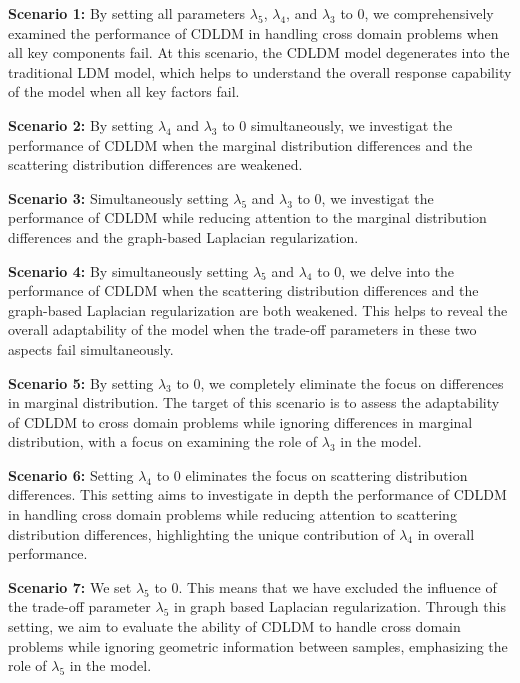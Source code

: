 \documentclass[a4paper]{cas-sc}
\begin{document}
\textbf{Scenario 1:} By setting all parameters $\lambda_5$, $\lambda_4$, and $\lambda_3$ to 0, we comprehensively examined the performance of CDLDM in handling cross domain problems when all key components fail. At this scenario, the CDLDM model degenerates into the traditional LDM model, which helps to understand the overall response capability of the model when all key factors fail.

\textbf{Scenario 2:} By setting $\lambda_4$ and $\lambda_3$ to 0 simultaneously, we investigat the performance of CDLDM when the marginal distribution differences and the scattering distribution differences are weakened.

\textbf{Scenario 3:} Simultaneously setting $\lambda_5$ and $\lambda_3$ to 0, we investigat the performance of CDLDM while reducing attention to the marginal distribution differences and the graph-based Laplacian regularization.

\textbf{Scenario 4:} By simultaneously setting $\lambda_5$ and $\lambda_4$ to 0, we delve into the performance of CDLDM when the scattering distribution differences and the graph-based Laplacian regularization are both weakened. This helps to reveal the overall adaptability of the model when the trade-off parameters in these two aspects fail simultaneously.

\textbf{Scenario 5:} By setting $\lambda_3$ to 0, we completely eliminate the focus on differences in marginal distribution. The target of this scenario is to assess the adaptability of CDLDM to cross domain problems while ignoring differences in marginal distribution, with a focus on examining the role of $\lambda_3$ in the model.

\textbf{Scenario 6:} Setting $\lambda_4$ to 0 eliminates the focus on scattering distribution differences. This setting aims to investigate in depth the performance of CDLDM in handling cross domain problems while reducing attention to scattering distribution differences, highlighting the unique contribution of $\lambda_4$ in overall performance.

\textbf{Scenario 7:} We set $\lambda_5$ to 0. This means that we have excluded the influence of the trade-off parameter $\lambda_5$ in graph based Laplacian regularization. Through this setting, we aim to evaluate the ability of CDLDM to handle cross domain problems while ignoring geometric information between samples, emphasizing the role of $\lambda_5$ in the model.
\end{document}
